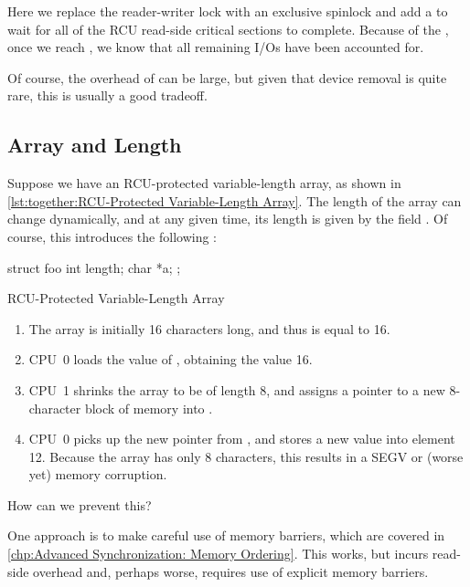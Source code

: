 \begin{fcvref}
Here we replace the reader-writer lock with an exclusive spinlock and
add a  to wait for all of the RCU read-side
critical sections to complete.
Because of the ,
once we reach ,
we know that all remaining I/Os have been accounted for.

Of course, the overhead of  can be large,
but given that device removal is quite rare, this is usually a good
tradeoff.
\end{fcvref}

\FloatBarrier
\subsection{Array and Length}
\label{sec:together:Array and Length}

Suppose we have an RCU-protected variable-length array, as shown in
\cref{lst:together:RCU-Protected Variable-Length Array}.
The length of the array  can change dynamically, and at any
given time, its length is given by the field .
Of course, this introduces the following :

\begin{listing}
\begin{VerbatimL}[tabsize=8]
struct foo {
	int length;
	char *a;
};
\end{VerbatimL}
\caption{RCU-Protected Variable-Length Array}
\label{lst:together:RCU-Protected Variable-Length Array}
\end{listing}

\begin{enumerate}
\item	The array is initially 16 characters long, and thus 
	is equal to 16.
\item	CPU~0 loads the value of , obtaining the value 16.
\item	CPU~1 shrinks the array to be of length 8, and assigns a pointer
	to a new 8-character block of memory into .
\item	CPU~0 picks up the new pointer from , and stores a
	new value into element 12.
	Because the array has only 8 characters, this results in
	a SEGV or (worse yet) memory corruption.
\end{enumerate}

How can we prevent this?

One approach is to make careful use of memory barriers, which are
covered in \cref{chp:Advanced Synchronization: Memory Ordering}.
This works, but incurs read-side overhead and, perhaps worse, requires
use of explicit memory barriers.

